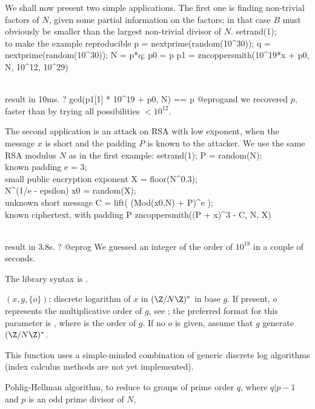 We shall now present two simple applications. The first one is
finding non-trivial factors of $N$, given some partial information on the
factors; in that case $B$ must obviously be smaller than the largest
non-trivial divisor of $N$.
\bprog
setrand(1); \\ to make the example reproducible
p = nextprime(random(10^30));
q = nextprime(random(10^30)); N = p*q;
p0 = p %
p1 = zncoppersmith(10^19*x + p0, N, 10^12, 10^29)

\\ result in 10ms.
? gcd(p1[1] * 10^19 + p0, N) == p
@eprog\noindent and we recovered $p$, faster than by trying all
possibilities $ < 10^{12}$.

The second application is an attack on RSA with low exponent, when the
message $x$ is short and the padding $P$ is known to the attacker. We use
the same RSA modulus $N$ as in the first example:
\bprog
setrand(1);
P = random(N);    \\ known padding
e = 3;            \\ small public encryption exponent
X = floor(N^0.3); \\ N^(1/e - epsilon)
x0 = random(X);   \\ unknown short message
C = lift( (Mod(x0,N) + P)^e ); \\ known ciphertext, with padding P
zncoppersmith((P + x)^3 - C, N, X)

\\ result in 3.8s.
? %
@eprog\noindent
We guessed an integer of the order of $10^{18}$ in a couple of seconds.

The library syntax is .

$(x,g,\{o\})$: \label{se:znlog}discrete logarithm of $x$ in $(\Z/N\Z)^*$ in base $g$.
If present, $o$ represents the multiplicative order of $g$, see
; the preferred format for this parameter is
, where  is the order of $g$.
If no $o$ is given, assume that $g$ generate $(\Z/N\Z)^*$.

This function uses a simple-minded combination of generic
discrete log algorithms (index calculus methods are not yet implemented).

\item Pohlig-Hellman algorithm, to reduce to groups of prime order $q$,
where $q | p-1$ and $p$ is an odd prime divisor of $N$,

